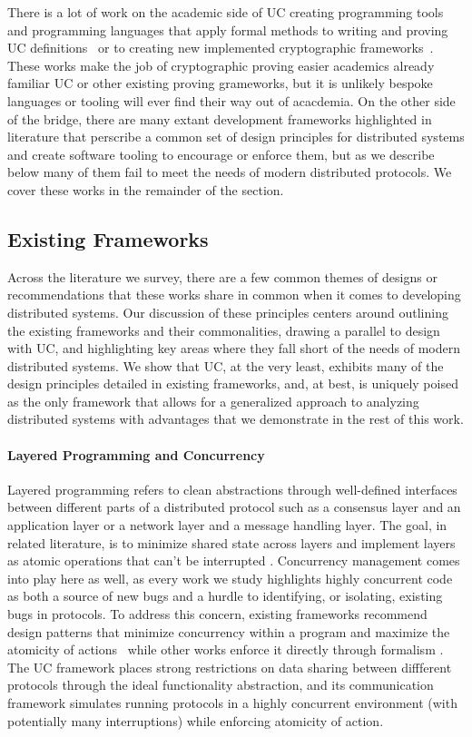 There is a lot of work on the academic side of UC creating programming tools
and programming languages that apply formal methods to writing and proving UC
definitions~\cite{liao2019ilc, canetti2019easyuc} or to creating new
implemented cryptographic frameworks~\cite{barbosa2021mechanized,
morrisett2021ipdl}.   These works make the job of cryptographic proving easier
academics already familiar UC or other existing proving grameworks, but it is
unlikely bespoke languages or tooling will ever find their way out of
acacdemia.  On the other side of the bridge, there are many extant development
frameworks highlighted in literature that perscribe a common set of design
principles for distributed systems and create software tooling to encourage or
enforce them, but as we describe below many of them fail to meet the needs of
modern distributed protocols.  We cover these works in the remainder of the
section.

\subsection{Existing Frameworks}
Across the literature we survey, there are a few common themes of designs or
recommendations that these works share in common when it comes to developing
distributed systems.  Our discussion of these principles centers around
outlining the existing frameworks and their commonalities, drawing a parallel
to design with UC, and highlighting key areas where they fall short of the
needs of modern distributed systems.  We show that UC, at the very least,
exhibits many of the design principles detailed in existing frameworks, and, at
best, is uniquely poised as the only framework that allows for a generalized
approach to analyzing distributed systems with advantages that we demonstrate
in the rest of this work.

\paragraph{Layered Programming and Concurrency}
Layered programming refers to clean abstractions through well-defined
interfaces between different parts of a distributed protocol such as a
consensus layer and an application layer or a network layer and a message
handling layer.  The goal, in related literature, is to minimize shared state
across layers and implement layers as atomic operations that can't be
interrupted \cite{killian2007mace, bolosky2007farsite}.  Concurrency management
comes into play here as well, as every work we study highlights highly
concurrent code as both a source of new bugs and a hurdle to identifying, or
isolating, existing bugs in protocols.  To address this concern, existing
frameworks recommend design patterns that minimize concurrency within a program
and maximize the atomicity of actions~\cite{bolosky2007farsite} while other
works enforce it directly through formalism \cite{killian2007mace,
wilcox2015verdi}.  The UC framework places strong restrictions on data sharing
between diffferent protocols through the ideal functionality abstraction, and
its communication framework simulates running protocols in a highly concurrent
environment (with potentially many interruptions) while enforcing atomicity of
action.

